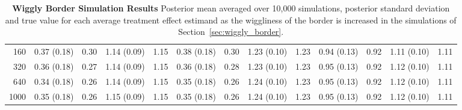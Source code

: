 \documentclass[letter,12pt]{article}
\begin{document}
\begin{landscape}
\begin{table}[!h]
\begin{tabular}{r|rrrrrrrrrrrr}
            160      & 0.37 (0.18) & 0.30    & 1.14 (0.09) & 1.15   & 0.38 (0.18) & 0.30   & 1.23 (0.10) & 1.23    & 0.94 (0.13) & 0.92   & 1.11 (0.10) & 1.11   \\
            320      & 0.36 (0.18) & 0.27    & 1.14 (0.09) & 1.15   & 0.36 (0.18) & 0.28   & 1.23 (0.10) & 1.23    & 0.95 (0.13) & 0.92   & 1.12 (0.10) & 1.11   \\
            640      & 0.34 (0.18) & 0.26    & 1.14 (0.09) & 1.15   & 0.35 (0.18) & 0.26   & 1.24 (0.10) & 1.23    & 0.95 (0.13) & 0.92   & 1.12 (0.10) & 1.11   \\
            1000     & 0.35 (0.18) & 0.26    & 1.15 (0.09) & 1.15   & 0.35 (0.18) & 0.26   & 1.24 (0.10) & 1.23    & 0.95 (0.13) & 0.92   & 1.12 (0.10) & 1.11 
            \\    \hline
        \end{tabular}
        \caption{\textbf{Wiggly Border Simulation Results} Posterior mean averaged over 10,000 simulations, posterior standard deviation and true value for each average treatment effect estimand as the wiggliness of the border is increased in the simulations of Section~\ref{sec:wiggly_border}.}
    \end{table}


\end{landscape}
\end{document}
